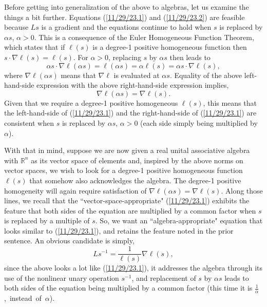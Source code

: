 \documentclass{amsart}
\numberwithin{equation}{section}
\theoremstyle{definition}
\numberwithin{theorem}{section}
\begin{document}
Before getting into generalization of the above to algebras, let us examine the things a bit further.  Equations (\ref{11/29/23.1}) and (\ref{11/29/23.2}) are feasible because $Ls$ is a gradient and the equations continue to hold when $s$ is replaced by $\alpha s$, $\alpha >0$.  This is a consequence of the Euler Homogeneous Function Theorem, which states that if $\ell(s)$ is a degree-1 positive homogeneous function then
  $s\cdot\nabla \ell(s) = \ell(s)$.  For $\alpha>0$, replacing $s$ by $\alpha s$ then leads to \[ \alpha s \cdot \nabla \ell(\alpha s) = \ell(\alpha s) = \alpha \ell(s) = \alpha s\cdot \nabla \ell(s),\] where $\nabla \ell(\alpha s)$ means that $\nabla \ell$ is evaluated at $\alpha s$. Equality of the above left-hand-side expression with the above right-hand-side expression implies, \begin{equation}\label{11/30/23.5} \nabla \ell(\alpha s) = \nabla \ell(s).\end{equation}    
  Given that we require a degree-1 positive homogeneous $\ell(s)$, this means that the left-hand-side of (\ref{11/29/23.1}) and the right-hand-side of (\ref{11/29/23.1}) are consistent when $s$ is replaced by $\alpha s$, $\alpha>0$ (each side simply being multiplied by $\alpha$).  
  
  With that in mind, suppose we are now given a real unital associative algebra with $\mathbb{R}^n$ as its vector space of elements  and, inspired by the above norms on vector spaces, we wish to look for a degree-1 positive homogeneous function $\ell(s)$ that somehow also acknowledges the algebra.  The degree-1 positive homogeneity will again require satisfaction of $\nabla\ell(\alpha s) = \nabla\ell(s)$.  Along those lines, we recall that the ``vector-space-appropriate" (\ref{11/29/23.1}) exhibits the feature that both sides of the equation are multiplied by a common factor when $s$ is replaced by a multiple of $s$.  So, we want an ``algebra-appropriate" equation that looks similar to (\ref{11/29/23.1}), and retains the feature noted in the prior sentence.  An obvious candidate is simply, \begin{equation}\label{12/22/23.1} Ls^{-1}=\frac{1}{\ell(s)}\nabla\ell(s),\end{equation} since the above looks a lot like (\ref{11/29/23.1}), it addresses the algebra through its use of the nonlinear unary operation $s^{-1}$, and replacement of $s$ by $\alpha s$ leads to both sides of the equation being multiplied by a common factor (this time it is \mbox{$\frac{1}{\alpha}$, instead of $\alpha$)}.   
  
\end{document}
